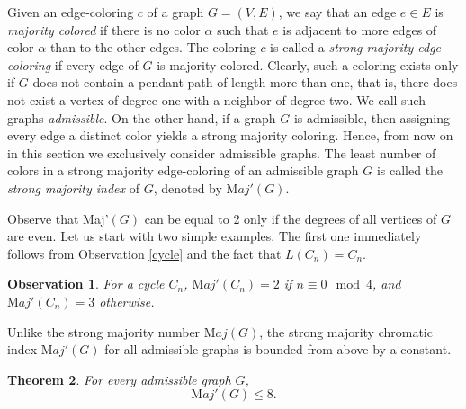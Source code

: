 \documentclass[11pt]{article}
\newtheorem{theorem}{Theorem}
\newtheorem{observation}[theorem]{Observation}
\begin{document}
Given an edge-coloring $c$ of a graph $G=(V,E)$, we say that an edge $e\in E$ is {\it majority colored} if there is no color $\alpha$ such that $e$ is adjacent to more edges of color $\alpha$ than to the other edges. The coloring $c$ 
is called a {\it strong majority edge-coloring} if every edge of $G$ is majority colored. Clearly, such a coloring exists only if $G$ does not contain a pendant path of length more than one, that is, there does not exist a vertex of degree one with a neighbor of degree two. We call such graphs {\it admissible}. On the other hand, if a graph $G$ is admissible, then assigning every edge a distinct color yields a strong majority coloring. Hence, from now on in this section we exclusively consider admissible graphs. The least number of colors in a strong majority edge-coloring of an admissible graph $G$ is called the {\it strong majority index} of $G$, denoted by ${\mathrm Maj'}(G)$. 

Observe that Maj'$(G)$ can be equal to 2 only if the degrees of all vertices of $G$ are even. Let us start with two simple examples. The first one immediately follows from Observation \ref{cycle} and the fact that $L(C_n)=C_n$.
\begin{observation}\label{cycle2}
For a cycle $C_n$, ${\mathrm Maj'}(C_n)=2$ if $n\equiv 0 \mod{4}$, and ${\mathrm Maj'}(C_n)=3$ otherwise.  
\end{observation}


Unlike the strong majority number ${\mathrm Maj}(G)$, the strong majority chromatic index ${\mathrm Maj'}(G)$ for all admissible graphs is bounded from above by a constant.

\begin{theorem}\label{edge col}
For every admissible graph $G$, $${\mathrm Maj'}(G)\le 8.$$    
\end{theorem}
\end{document}

